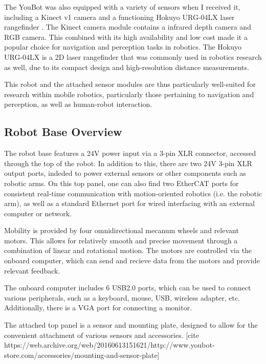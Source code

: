 \documentclass[a4paper, 12pt]{article}
\newif\ifshownotes
\newcommand{\notes}[1]{\ifshownotes\textcolor{blue}{#1}\fi}
\begin{document}
    The YouBot was also equipped with a variety of sensors when I received it, including a Kinect v1 camera \notes{[cite]} and a functioning Hokuyo URG-04LX laser rangefinder \notes{[cite]}. The Kinect camera module contains a infrared depth camera and RGB camera. This combined with its high availability and low cost made it a popular choice for navigation and perception tasks in robotics. The Hokuyo URG-04LX is a 2D laser rangefinder that was commonly used in robotics research as well, due to its compact design and high-resolution distance measurements. 

    This robot and the attached sensor modules are thus particularly well-suited for research within mobile robotics, particularly those pertaining to navigation and perception, as well as human-robot interaction. 

    \subsection{Robot Base Overview}

    \notes{initial inspection\\}


    The robot base features a 24V power input via a 3-pin XLR connector, accessed through the top of the robot. In addition to this, there are two 24V 3-pin XLR output ports, indeded to power external sensors or other components such as robotic arms. On this top panel, one can also find two EtherCAT ports for consistent real-time communication with motion-oriented robotics (i.e. the robotic arm), as well as a standard Ethernet port for wired interfacing with an external computer or network. 

    Mobility is provided by four omnidirectional mecanum wheels and relevant motors. This allows for relatively smooth and precise movement through a combination of linear and rotational motion. The motors are controlled via the onboard computer, which can send and recieve data from the motors and provide relevant feedback.

    The onboard computer includes 6 USB2.0 ports, which can be used to connect various peripherals, such as a keyboard, mouse, USB, wireless adapter, etc. Additionally, there is a VGA port for connecting a monitor. \cite{githubYoubotOverview}  

    The attached top panel is a sensor and mounting plate, designed to allow for the convenient attachment of various sensors and accessories. [cite https://web.archive.org/web/20160613151621/http://www.youbot-store.com/accessories/mounting-and-sensor-plate]
\end{document}
